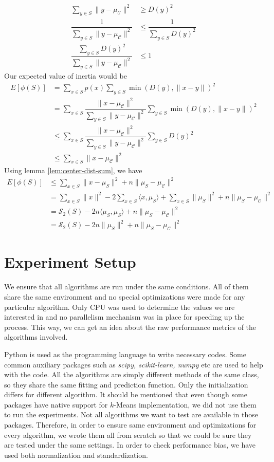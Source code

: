\documentclass[twoside, 11pt]{article}
\newcommand{\C}{\mathcal{C}}
\renewcommand{\S}{\mathcal{S}}
\begin{document}
		\begin{align*}
			\sum_{y\in S}\|y-\mu_{\C}\|^2 & \geq D(y)^2\\
			\dfrac{1}{\sum_{y\in S}\|y-\mu_{\C}\|^2} & \leq \dfrac{1}{\sum_{y\in S}D(y)^2}\\
			\dfrac{\sum_{y\in S}D(y)^2}{\sum_{y\in S}\|y-\mu_{\C}\|^2} & \leq 1
		\end{align*}
	Our expected value of inertia would be
		\begin{align*}
			E[\phi(S)] & = \sum_{x\in S}p(x)\sum_{y\in S}\min(D(y),\|x-y\|)^2\\
					   & = \sum_{x\in S}\dfrac{\|x-\mu_{\C}\|^2}{\sum_{y\in S}\|y-\mu_{\C}\|^2}\sum_{y\in S}\min(D(y),\|x-y\|)^2\\
					   & \leq \sum_{x\in S}\dfrac{\|x-\mu_{\C}\|^2}{\sum_{y\in S}\|y-\mu_{\C}\|^2}\sum_{y\in S}D(y)^2\\
					   & \leq \sum_{x\in S}\|x-\mu_{\C}\|^2
		\end{align*}
	Using lemma \eqref{lem:center-dist-sum}, we have
		\begin{align*}
			E[\phi(S)] & \leq \sum_{x\in S}\|x-\mu_{S}\|^2+n\|\mu_{S}-\mu_{\C}\|^2\\
					   & = \sum_{x\in S}\|x\|^2-2\sum_{x\in S}\langle x,\mu_{S}\rangle+\sum_{x\in S}\|\mu_{S}\|^2+n\|\mu_{S}-\mu_{\C}\|^2\\
					   & = \S_2(S)-2n\langle\mu_{S},\mu_{S}\rangle+n\|\mu_{S}-\mu_{\C}\|^2\\
					   & = \S_2(S)-2n\|\mu_{S}\|^2+n\|\mu_{S}-\mu_{\C}\|^2
		\end{align*}
	\section{Experiment Setup}
	We ensure that all algorithms are run under the same conditions. All of them share the same environment and no special optimizations were made for any particular algorithm. Only CPU was used to determine the values we are interested in and no parallelism mechanism was in place for speeding up the process. This way, we can get an idea about the raw performance metrics of the algorithms involved.
	
	Python is used as the programming language to write necessary codes. Some common auxiliary packages such as \textit{scipy, scikit-learn, numpy} etc are used to help with the code. All the algorithms are simply different methods of the same class, so they share the same fitting and prediction function. Only the initialization differs for different algorithm. It should be mentioned that even though some packages have native support for $k$-Means implementation, we did not use them to run the experiments. Not all algorithms we want to test are available in those packages. Therefore, in order to ensure same environment and optimizations for every algorithm, we wrote them all from scratch so that we could be sure they are tested under the same settings. In order to check performance bias, we have used both normalization and standardization.
	
\end{document}
